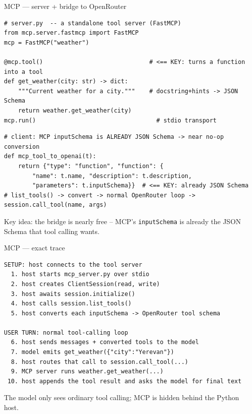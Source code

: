 \documentclass[aspectratio=169,10pt]{beamer}
\begin{document}
\begin{frame}[fragile]{MCP --- server + bridge to OpenRouter}
\begin{lstlisting}
# server.py  -- a standalone tool server (FastMCP)
from mcp.server.fastmcp import FastMCP
mcp = FastMCP("weather")

@mcp.tool()                              # <== KEY: turns a function into a tool
def get_weather(city: str) -> dict:
    """Current weather for a city."""    # docstring+hints -> JSON Schema
    return weather.get_weather(city)
mcp.run()                                  # stdio transport
\end{lstlisting}
\begin{lstlisting}
# client: MCP inputSchema is ALREADY JSON Schema -> near no-op conversion
def mcp_tool_to_openai(t):
    return {"type": "function", "function": {
        "name": t.name, "description": t.description,
        "parameters": t.inputSchema}}  # <== KEY: already JSON Schema
# list_tools() -> convert -> normal OpenRouter loop -> session.call_tool(name, args)
\end{lstlisting}
\footnotesize \alert{Key idea:} the bridge is nearly free -- MCP's \texttt{inputSchema} is already the JSON Schema that tool calling wants.
\end{frame}

\begin{frame}[fragile]{MCP --- exact trace}
\begin{lstlisting}[style=ascii]
SETUP: host connects to the tool server
  1. host starts mcp_server.py over stdio
  2. host creates ClientSession(read, write)
  3. host awaits session.initialize()
  4. host calls session.list_tools()
  5. host converts each inputSchema -> OpenRouter tool schema

USER TURN: normal tool-calling loop
  6. host sends messages + converted tools to the model
  7. model emits get_weather({"city":"Yerevan"})
  8. host routes that call to session.call_tool(...)
  9. MCP server runs weather.get_weather(...)
 10. host appends the tool result and asks the model for final text
\end{lstlisting}
\footnotesize The model only sees ordinary tool calling; MCP is hidden behind the Python host.
\end{frame}
\end{document}
